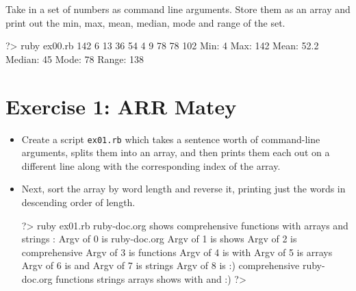 \documentclass{42-en}
\begin{document}
Take in a set of numbers as command line arguments. Store them as an array and print out the min, max, mean, median, mode and range of the set.

\begin{42console}
	?> ruby ex00.rb 142 6 13 36 54 4 9 78 78 102
	Min: 4
	Max: 142
	Mean: 52.2
	Median: 45
	Mode: 78
	Range: 138
\end{42console}



\chapter{Exercise 1: ARR Matey}


\makeheaderfiles

\begin{itemize}

\item Create a script \texttt{ex01.rb} which takes a sentence worth of command-line arguments, splits them into an array, and then prints them each out on a different line along with the corresponding index of the array.
\item Next, sort the array by word length and reverse it, printing just the words in descending order of length.

\begin{42console}
	?> ruby ex01.rb ruby-doc.org shows comprehensive functions with arrays and strings :\)
	Argv of 0 is ruby-doc.org
	Argv of 1 is shows
	Argv of 2 is comprehensive
	Argv of 3 is functions
	Argv of 4 is with
	Argv of 5 is arrays
	Argv of 6 is and
	Argv of 7 is strings
	Argv of 8 is :)
	comprehensive
	ruby-doc.org
	functions
	strings
	arrays
	shows
	with
	and
	:)
	?>
\end{42console}

\end{itemize}


\end{document}
